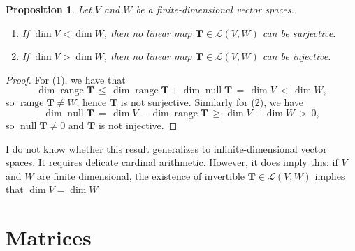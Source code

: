 \documentclass[11pt]{article}
\newtheorem{proposition}{Proposition}
\newcommand{\mat}[1]{\mathbf{#1}}
\newcommand{\nll}{\operatorname{null}}
\newcommand{\range}{\operatorname{range}}
\begin{document}
\begin{adjustwidth}{0.5cm}{}
  \begin{proposition}
    Let $V$ and $W$ be a finite-dimensional vector spaces.
    \begin{enumerate}
      \item If $\dim V < \dim W$, then no linear map $\mat{T} \in \mathcal{L}(V, W)$ can be surjective.
      \item If $\dim V > \dim W$, then no linear map $\mat{T} \in \mathcal{L}(V, W)$ can be injective.
    \end{enumerate}
  \end{proposition}
  \begin{proof}
    For (1), we have that
    \[
      \dim \range \mat{T} \, \le \, \dim \range \mat{T} + \dim \nll \mat{T} \, = \, \dim V \, < \, \dim W,
    \]
    so $\range \mat{T} \ne W$; hence $\mat{T}$ is not surjective. Similarly for (2), we have
    \[
      \dim \nll \mat{T} \, = \, \dim V - \dim \range \mat{T} \, \ge \, \dim V - \dim W \, > \, 0,
    \]
    so $\nll \mat{T} \ne 0$ and $\mat{T}$ is not injective.
  \end{proof}
\end{adjustwidth}

I do not know whether this result generalizes to infinite-dimensional vector spaces. It requires delicate cardinal arithmetic. However, it does imply this: if $V$ and $W$ are finite dimensional, the existence of invertible $\mat{T} \in \mathcal{L}(V, W)$ implies that $\dim V = \dim W$


\section{Matrices}

\end{document}
